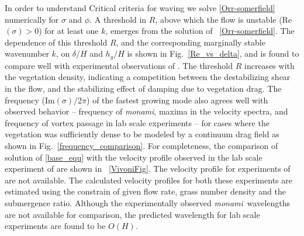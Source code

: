\documentclass[12pt]{report}   %
\newcommand{\hg}{h_g}
\newcommand{\Rey}{{R}}
\newcommand{\monami}{\textit{monami}}
\begin{document}
In order to understand Critical criteria for waving we solve \eqref{Orr-somerfield} numerically for $\sigma$ and $\phi$. A threshold in $\Rey$, above which the flow is unstable (Re$(\sigma)>0$) for at least one $k$, emerges from the solution of ~\eqref{Orr-somerfield}. 
The dependence of this threshold $\Rey$, and the corresponding marginally stable wavenumber $k$, on $\delta/H$ and $\hg/H$ is shown in Fig.~\ref{Re_vs_delta}, and is found to compare well with experimental observations of \cite{Ghisal02}.
The threshold $\Rey$ increases with the vegetation density, indicating a competition between the destabilizing shear in the flow, and the stabilizing effect of damping due to vegetation drag.
The frequency (Im$(\sigma)$/2$\pi$) of the fastest growing mode also agrees well with observed behavior -- frequency of \monami, maxima in the velocity spectra, and frequency of vortex passage in lab scale experiments \cite{Ghisal02} -- for cases where the vegetation was sufficiently dense to be modeled by a continuum drag field as shown in Fig.~\ref{frequency_comparison}. For completeness, the comparison of solution of \eqref{base_equ}
with the velocity profile observed in the lab scale experiment of \cite{Vivoni98} are shown in ~\ref{VivoniFig}. The velocity profile for experiments of \cite{Ghisal02} are not
available. The calculated velocity profiles for both these experiments are estimated using the constrain of given flow rate, grass number density and the submergence ratio.
Although the experimentally observed \monami ~wavelengths are not available for comparison, the predicted wavelength for lab scale experiments \citep{Ghisal02} are found to be $O(H)$.
\end{document}
